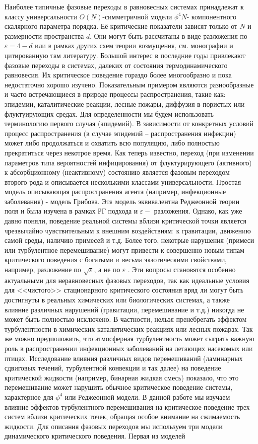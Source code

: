 \documentclass []{rusthesis} %
\begin{document}
Наиболее типичные фазовые переходы в равновесных системах принадлежат к классу универсальности $O(N)$-симметричной модели $\phi^4 N$- компонентного скалярного параметра порядка. Её критические показатели зависят только от $N$ и размерности пространства $d$. Они могут быть рассчитаны в виде разложения по $\varepsilon = 4-d$ или в рамках других схем теории возмущения, см. монографии \cite{Zinn, Book3} и цитированную там литературу. Большой интерес в последние годы привлекают фазовые переходы в системах, далеких от состояния термодинамического равновесия. Их критическое поведение гораздо более многообразно и пока недостаточно хорошо изучено. Показательным примером являются разнообразные и часто встречающиеся в природе процессы распространения, такие как: эпидемии, каталитические реакции, лесные пожары, диффузия в пористых или флуктуирующих средах. Для определенности мы будем использовать терминологию первого случая (эпидемий). В зависимости от конкретных условий процесс распространения (в случае эпидемий -- распространения инфекции) может либо продолжаться и охватить всю популяцию, либо полностью прекратиться через некотрое время. Как теперь известно, переход (при изменении параметров типа вероятностей инфицирования) от флуктурирующего (активного) к абсорбционному (неактивному) состоянию является фазовым переходом второго рода и описывается несколькими классами универсальности. Простая модель описывающая распространения агента (например, инфекционные заболевания) - модель Грибова. Эта модель эквивалентна Реджеонной теории поля и была изучена в рамках РГ подхода и $\varepsilon-$ разложения. Однако, как уже давно поняли, поведение реальной системы вблизи критической точки является чрезвычайно чувствительным к внешним воздействиям: к гравитации, движению самой среды, наличию примесей и т.д. Более того, некотрые нарушения (примеси или турбулентное перемешивание) могут привести к совершенно новым типам критического поведения с богатыми и весьма экзотическими свойствами, например, разложение по $\sqrt{\varepsilon}$, а не по $\varepsilon$ \cite{quench, Satten}. Эти вопросы становятся особенно актуальными для неравновесных фазовых переходов, так как идеальные условия для <<чистого>> стационарного критического состояния вряд ли могут быть достигнуты в реальных химических или биологических системах, а также влияние различных нарушений (гравитации, перемешивание и т.д.) никогда не может быть полностью исключено. В частности, нельзя пренебрегать эффектом турбулентности в химических каталитических реакциях или лесных пожарах. Так же можно предположить, что атмосферная турбулентность может сыграть важную роль в распространении инфекционных заболеваний на летающих насекомых или птицах. Исследование влияния различных видов перемешиваний (ламинарных сдвиговых течений, турбулентной конвекции и так далее) на поведение критической жидкости (например, бинарная жидкая смесь) показало, что это перемешивание может нарушить обычное критическое поведение системы, характерное для $\phi^4$ или Реджеонной модели. В данной работе мы изучаем влияние эффектов турбулентного перемешивания на критическое поведение трех систем вблизи критических точек, обращая особое внимание на сжимаемость жидкости. Для описания фазовых переходов мы используем три модели динамического критического поведения. Первая из моделей 
\end{document}
